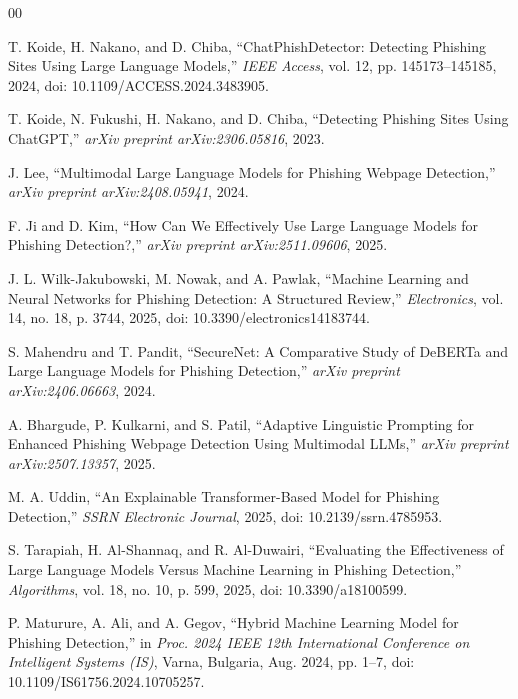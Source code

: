 \documentclass[conference]{IEEEtran}
\begin{document}
\begin{thebibliography}{00}

T. Koide, H. Nakano, and D. Chiba, ``ChatPhishDetector: Detecting Phishing Sites Using Large Language Models,'' \textit{IEEE Access}, vol. 12, pp. 145173--145185, 2024, doi: 10.1109/ACCESS.2024.3483905.

T. Koide, N. Fukushi, H. Nakano, and D. Chiba, ``Detecting Phishing Sites Using ChatGPT,'' \textit{arXiv preprint arXiv:2306.05816}, 2023.

J. Lee, ``Multimodal Large Language Models for Phishing Webpage Detection,'' \textit{arXiv preprint arXiv:2408.05941}, 2024.

F. Ji and D. Kim, ``How Can We Effectively Use Large Language Models for Phishing Detection?,'' \textit{arXiv preprint arXiv:2511.09606}, 2025.

J. L. Wilk-Jakubowski, M. Nowak, and A. Pawlak, ``Machine Learning and Neural Networks for Phishing Detection: A Structured Review,'' \textit{Electronics}, vol. 14, no. 18, p. 3744, 2025, doi: 10.3390/electronics14183744.

S. Mahendru and T. Pandit, ``SecureNet: A Comparative Study of DeBERTa and Large Language Models for Phishing Detection,'' \textit{arXiv preprint arXiv:2406.06663}, 2024.

A. Bhargude, P. Kulkarni, and S. Patil, ``Adaptive Linguistic Prompting for Enhanced Phishing Webpage Detection Using Multimodal LLMs,'' \textit{arXiv preprint arXiv:2507.13357}, 2025.

M. A. Uddin, ``An Explainable Transformer-Based Model for Phishing Detection,'' \textit{SSRN Electronic Journal}, 2025, doi: 10.2139/ssrn.4785953.

S. Tarapiah, H. Al-Shannaq, and R. Al-Duwairi, ``Evaluating the Effectiveness of Large Language Models Versus Machine Learning in Phishing Detection,'' \textit{Algorithms}, vol. 18, no. 10, p. 599, 2025, doi: 10.3390/a18100599.

P. Maturure, A. Ali, and A. Gegov, ``Hybrid Machine Learning Model for Phishing Detection,'' in \textit{Proc. 2024 IEEE 12th International Conference on Intelligent Systems (IS)}, Varna, Bulgaria, Aug. 2024, pp. 1--7, doi: 10.1109/IS61756.2024.10705257.


\end{thebibliography}
\end{document}
